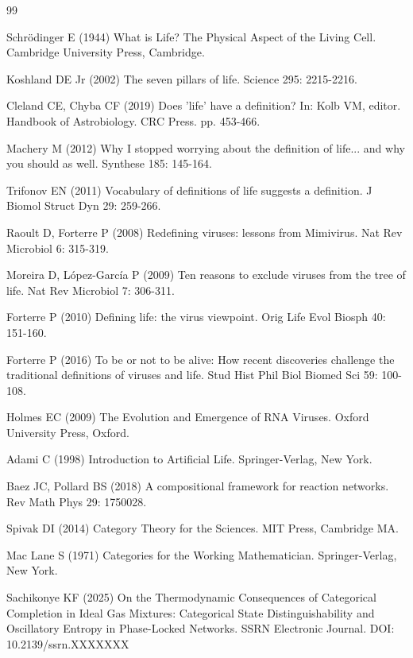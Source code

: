 \documentclass[11pt]{article}
\begin{document}

\begin{thebibliography}{99}

Schrödinger E (1944) What is Life? The Physical Aspect of the Living Cell. Cambridge University Press, Cambridge.

Koshland DE Jr (2002) The seven pillars of life. Science 295: 2215-2216.

Cleland CE, Chyba CF (2019) Does 'life' have a definition? In: Kolb VM, editor. Handbook of Astrobiology. CRC Press. pp. 453-466.

Machery M (2012) Why I stopped worrying about the definition of life... and why you should as well. Synthese 185: 145-164.

Trifonov EN (2011) Vocabulary of definitions of life suggests a definition. J Biomol Struct Dyn 29: 259-266.

Raoult D, Forterre P (2008) Redefining viruses: lessons from Mimivirus. Nat Rev Microbiol 6: 315-319.

Moreira D, López-García P (2009) Ten reasons to exclude viruses from the tree of life. Nat Rev Microbiol 7: 306-311.

Forterre P (2010) Defining life: the virus viewpoint. Orig Life Evol Biosph 40: 151-160.

Forterre P (2016) To be or not to be alive: How recent discoveries challenge the traditional definitions of viruses and life. Stud Hist Phil Biol Biomed Sci 59: 100-108.

Holmes EC (2009) The Evolution and Emergence of RNA Viruses. Oxford University Press, Oxford.

Adami C (1998) Introduction to Artificial Life. Springer-Verlag, New York.

Baez JC, Pollard BS (2018) A compositional framework for reaction networks. Rev Math Phys 29: 1750028.

Spivak DI (2014) Category Theory for the Sciences. MIT Press, Cambridge MA.

Mac Lane S (1971) Categories for the Working Mathematician. Springer-Verlag, New York.

Sachikonye KF (2025) On the Thermodynamic Consequences of Categorical Completion in Ideal Gas Mixtures: Categorical State Distinguishability and Oscillatory Entropy in Phase-Locked Networks. SSRN Electronic Journal. DOI: 10.2139/ssrn.XXXXXXX


\end{thebibliography}
\end{document}
